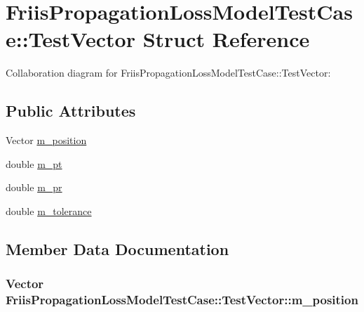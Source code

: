 \hypertarget{structFriisPropagationLossModelTestCase_1_1TestVector}{}\section{Friis\+Propagation\+Loss\+Model\+Test\+Case\+:\+:Test\+Vector Struct Reference}
\label{structFriisPropagationLossModelTestCase_1_1TestVector}


Collaboration diagram for Friis\+Propagation\+Loss\+Model\+Test\+Case\+:\+:Test\+Vector\+:
\subsection*{Public Attributes}
\begin{DoxyCompactItemize}
\item 
Vector \hyperlink{structFriisPropagationLossModelTestCase_1_1TestVector_a6f69fa5b69569009dec56cdce9ea4ee7}{m\+\_\+position}
\item 
double \hyperlink{structFriisPropagationLossModelTestCase_1_1TestVector_a792c206f5c0b31103ac43ff7e1f7870c}{m\+\_\+pt}
\item 
double \hyperlink{structFriisPropagationLossModelTestCase_1_1TestVector_a028b59fc414d1534943f2f31b6025ad2}{m\+\_\+pr}
\item 
double \hyperlink{structFriisPropagationLossModelTestCase_1_1TestVector_a8f90758f5d9391091517d19fe1442fba}{m\+\_\+tolerance}
\end{DoxyCompactItemize}


\subsection{Member Data Documentation}
\subsubsection[{\texorpdfstring{m\+\_\+position}{m_position}}]{\setlength{\rightskip}{0pt plus 5cm}Vector Friis\+Propagation\+Loss\+Model\+Test\+Case\+::\+Test\+Vector\+::m\+\_\+position}\hypertarget{structFriisPropagationLossModelTestCase_1_1TestVector_a6f69fa5b69569009dec56cdce9ea4ee7}{}\label{structFriisPropagationLossModelTestCase_1_1TestVector_a6f69fa5b69569009dec56cdce9ea4ee7}

